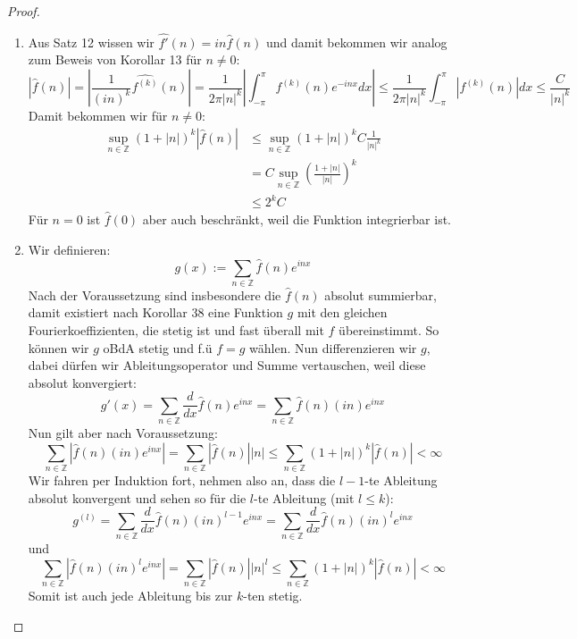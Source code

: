 \documentclass[11pt]{article}
\newcommand{\Z}{\mathbb{Z}}
\begin{document}
    \begin{proof}
        \begin{enumerate}[label = (\alph*)]
            \item Aus Satz 12 wissen wir $\hat{f'}(n)=in\hat{f}(n)$ und damit bekommen wir analog
            zum Beweis von Korollar 13 für $n\neq 0$:
            $$|\hat{f}(n)|=\left|\frac{1}{(in)^k}\hat{f^{(k)}}(n)\right|=
            \frac{1}{2\pi |n|^k}\left|\int_{-\pi}^{\pi} f^{(k)}(n)e^{-inx}dx\right|\leq
            \frac{1}{2\pi |n|^k}\int_{-\pi}^{\pi} |f^{(k)}(n)|dx\leq \frac{C}{|n|^k}$$
            Damit bekommen wir für $n\neq 0$:
            $$\begin{aligned}
                  \sup _{n \in \mathbb{Z}}(1+|n|)^k|\hat{f}(n)|&\leq
                  \sup _{n \in \mathbb{Z}}(1+|n|)^k C\frac{1}{|n|^k}\\
                  &= C\sup _{n \in \mathbb{Z}}\left(\frac{1+|n|}{|n|}\right)^k\\
                  &\leq 2^kC
            \end{aligned} $$
            Für $n=0$ ist $\hat{f}(0)$ aber auch beschränkt, weil die Funktion integrierbar ist.
            \item Wir definieren:
            $$g(x):= \sum_{n\in\Z} \hat{f}(n) e^{inx}$$
            Nach der Voraussetzung sind insbesondere die $\hat{f}(n)$ absolut summierbar, damit
            existiert nach Korollar 38 eine Funktion $g$ mit den gleichen Fourierkoeffizienten,
            die stetig ist und fast überall mit $f$ übereinstimmt. So können wir
            $g$ oBdA stetig und f.ü $f=g$ wählen. Nun differenzieren wir $g$, dabei dürfen wir
            Ableitungsoperator und Summe vertauschen, weil diese absolut konvergiert:
            $$g'(x) =\sum_{n\in\Z}\frac{d}{dx} \hat{f}(n) e^{inx}=\sum_{n\in\Z} \hat{f}(n)(in) e^{inx}$$
            Nun gilt aber nach Voraussetzung:
            $$\sum_{n\in\Z} |\hat{f}(n)(in) e^{inx}|=\sum_{n\in\Z} |\hat{f}(n)||n|
            \leq \sum_{n \in \mathbb{Z}}(1+|n|)^k|\hat{f}(n)|<\infty$$
            Wir fahren per Induktion fort, nehmen also an, dass die $l-1$-te Ableitung absolut konvergent
            und sehen so für die $l$-te Ableitung (mit $l\leq k$):
            $$g^{(l)}=\sum_{n\in\Z}\frac{d}{dx} \hat{f}(n)(in)^{l-1} e^{inx}=
            \sum_{n\in\Z}\frac{d}{dx} \hat{f}(n)(in)^{l} e^{inx}$$
            und
            $$\sum_{n\in\Z} |\hat{f}(n)(in)^l e^{inx}|=\sum_{n\in\Z} |\hat{f}(n)||n|^l
            \leq \sum_{n \in \mathbb{Z}}(1+|n|)^k|\hat{f}(n)|<\infty$$
            Somit ist auch jede Ableitung bis zur $k$-ten stetig.

\end{enumerate}
\end{proof}
\end{document}
